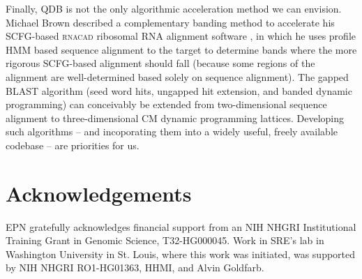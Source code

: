 \documentclass[11pt]{article}
\newif\ifdraft
\begin{document}
Finally, QDB is not the only algorithmic acceleration method we can
envision.  Michael Brown described a complementary banding method to
accelerate his SCFG-based \textsc{rnacad} ribosomal RNA alignment
software \cite{Brown00}, in which he uses profile HMM based sequence
alignment to the target to determine bands where the more rigorous
SCFG-based alignment should fall (because some regions of the
alignment are well-determined based solely on sequence alignment). The
gapped BLAST algorithm (seed word hits, ungapped hit extension, and
banded dynamic programming) can conceivably be extended from
two-dimensional sequence alignment to three-dimensional CM dynamic
programming lattices. Developing such algorithms -- and incoporating
them into a widely useful, freely available codebase -- are priorities
for us.

\section{Acknowledgements}

EPN gratefully acknowledges financial support from an NIH NHGRI
Institutional Training Grant in Genomic Science, T32-HG000045. Work in
SRE's lab in Washington University in St. Louis, where this work was
initiated, was supported by NIH NHGRI RO1-HG01363, HHMI, and Alvin
Goldfarb.


\newpage
%


\ifdraft
 \relax
\else

\newpage


\newpage


\newpage


\newpage


\newpage


\newpage


\newpage


\newpage


\newpage


\newpage


\newpage

\fi
\end{document}
